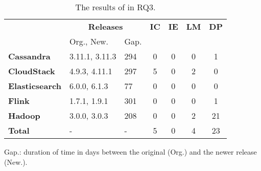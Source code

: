 


\begin{table}
    \caption{\label{RQ3}The results of \toolS in RQ3. 
    }
    \vspace{-0.3cm}
    \centering
    \resizebox{\columnwidth}{!} {
    \tabcolsep=8pt


    \begin{tabular}{lll|c|c|c|c}

        \toprule
        & \multicolumn{2}{c|}{\textbf{Releases}} & \multicolumn{1}{c|}{\textbf{IC}} & \multicolumn{1}{c|}{\textbf{IE}} & \multicolumn{1}{c|}{\textbf{LM}} & \multicolumn{1}{c}{\textbf{DP}}\\
        & Org., New. &Gap.  & & & & \\
        \midrule
        \textbf{Cassandra}     & 3.11.1, 3.11.3 & 294 & 0 & 0 & 0 & 1 \\
        \textbf{CloudStack}     & 4.9.3, 4.11.1 & 297 & 5 & 0 & 2 & 0 \\
        \textbf{Elasticsearch}  & 6.0.0, 6.1.3 & 77 & 0 & 0 & 0 & 0 \\
        \textbf{Flink}         & 1.7.1, 1.9.1 & 301 & 0 & 0 & 0 & 1 \\
        \textbf{Hadoop}         & 3.0.0, 3.0.3 & 208 & 0 & 0 & 2 & 21 \\

        \midrule
        \textbf{Total}         & -  & - & 5 & 0 & 4 & 23 \\
        \bottomrule
    \end{tabular}
    }

    Gap.: duration of time in days between the original (Org.) and the newer release (New.).
    \vspace{-0.4cm}
\end{table}






